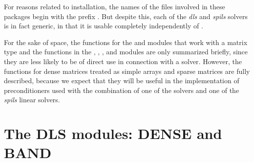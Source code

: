For reasons related to installation, the names of the files involved
in these packages begin with the prefix .  But
despite this, each of the {\em dls} and {\em spils} solvers is in fact generic, 
in that it is usable completely independently of {\sundials}.

For the sake of space, the functions for the  and  modules
that work with a matrix type and the functions in the {\spgmr}, 
{\spfgmr}, {\spbcg}, and {\sptfqmr}
modules are only summarized briefly, since they are less likely to be of direct use
in connection with a {\sundials} solver.  However, the functions for dense matrices 
treated as simple arrays and sparse matrices are fully described,
because we expect that they will be 
useful in the implementation of preconditioners used with the combination of one of
the {\sundials} solvers and one of the {\em spils} linear solvers.



\section{The DLS modules: DENSE and BAND}\label{s:dls}

